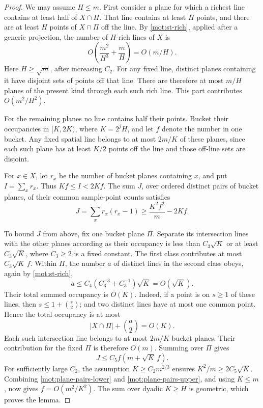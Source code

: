 \begin{proof}
We may assume \(H\le m\).  First consider a plane for which a
richest line contains at least half of \(X\cap\Pi\).
That line contains at least \(H\) points, and there are at least
\(H\) points of \(X\cap\Pi\) off the line.  By
\eqref{mot:st-rich}, applied after a generic projection, the
number of \(H\)-rich lines of \(X\) is
\[
 O\left(\frac{m^2}{H^3}+\frac mH\right)=O(m/H).
\]
Here \(H\ge\sqrt m\), after increasing \(C_2\).
For any fixed line, distinct planes containing it have disjoint
sets of points off that line.  There are therefore at most
\(m/H\) planes of the present kind through each such rich line.
This part contributes \(O(m^2/H^2)\).

For the remaining planes no line contains half their points.
Bucket their occupancies in \([K,2K)\), where
\(K=2^jH\), and let \(f\) denote the number in one bucket.
Any fixed spatial line belongs to at most \(2m/K\) of these
planes, since each such plane has at least \(K/2\) points off
the line and those off-line sets are disjoint.

For \(x\in X\), let \(r_x\) be the number of bucket planes
containing \(x\), and put \(I=\sum_xr_x\).  Thus
\(Kf\le I<2Kf\).  The sum \(J\), over ordered distinct pairs
of bucket planes, of their common sample-point counts satisfies
\begin{equation}
\label{mot:plane-pairs-lower}
 J=\sum_xr_x(r_x-1)
 \ge \frac{K^2f^2}{m}-2Kf.
\end{equation}

To bound \(J\) from above, fix one bucket plane \(\Pi\).
Separate its intersection lines with the other planes according
as their occupancy is less than \(C_3\sqrt K\) or at least
\(C_3\sqrt K\), where \(C_3\ge2\) is a fixed constant.
The first class contributes at most \(C_3\sqrt K\,f\).
Within \(\Pi\), the number \(a\) of distinct lines in the second
class obeys, again by \eqref{mot:st-rich},
\[
 a\le C_4\left(C_3^{-3}+C_3^{-1}\right)\sqrt K
 =O(\sqrt K).
\]
Their total summed occupancy is \(O(K)\).  Indeed, if a point is
on \(s\ge1\) of these lines, then
\(s\le1+\binom{s}{2}\); and two distinct lines have at most one
common point.  Hence the total occupancy is at most
\[
 |X\cap\Pi|+\binom a2=O(K).
\]
Each such intersection line belongs to at most \(2m/K\) bucket
planes.  Their contribution for the fixed \(\Pi\) is therefore
\(O(m)\).  Summing over \(\Pi\) gives
\begin{equation}
\label{mot:plane-pairs-upper}
 J\le C_5 f(m+\sqrt K\,f).
\end{equation}
For sufficiently large \(C_2\), the assumption
\(K\ge C_2m^{2/3}\) ensures
\(K^2/m\ge2C_5\sqrt K\).  Combining
\eqref{mot:plane-pairs-lower} and
\eqref{mot:plane-pairs-upper}, and using \(K\le m\), now gives
\(f=O(m^2/K^2)\).  The sum over dyadic \(K\ge H\) is geometric,
which proves the lemma.
\end{proof}

